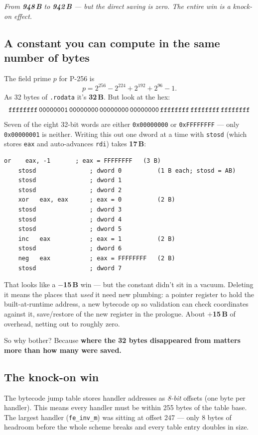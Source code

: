 \documentclass[11pt,a4paper]{article}
\newcommand{\bytes}[1]{\textcolor{blue!60!black}{\textbf{#1\,B}}}
\newcommand{\saved}[1]{\textcolor{green!50!black}{\textbf{$-$#1\,B}}}
\newcommand{\spent}[1]{\textcolor{red!70!black}{\textbf{$+$#1\,B}}}
\begin{document}
\noindent\emph{From \bytes{948} to \bytes{942} --- but the direct
saving is zero. The entire win is a knock-on effect.}

\subsection{A constant you can compute in the same number of bytes}

The field prime $p$ for P-256 is
\[
  p = 2^{256} - 2^{224} + 2^{192} + 2^{96} - 1.
\]
As 32 bytes of \texttt{.rodata} it's \bytes{32}. But look at the hex:
\[
\texttt{ffffffff\,00000001\,00000000\,00000000\,00000000\,ffffffff\,ffffffff\,ffffffff}
\]
Seven of the eight 32-bit words are either \texttt{0x00000000} or
\texttt{0xFFFFFFFF} --- only \texttt{0x00000001} is neither. Writing
this out one dword at a time with \texttt{stosd} (which stores
\texttt{eax} and auto-advances \texttt{rdi}) takes \bytes{17}:
\begin{lstlisting}[language={[x86masm]Assembler}]
    or    eax, -1       ; eax = FFFFFFFF   (3 B)
    stosd               ; dword 0          (1 B each; stosd = AB)
    stosd               ; dword 1
    stosd               ; dword 2
    xor   eax, eax      ; eax = 0          (2 B)
    stosd               ; dword 3
    stosd               ; dword 4
    stosd               ; dword 5
    inc   eax           ; eax = 1          (2 B)
    stosd               ; dword 6
    neg   eax           ; eax = FFFFFFFF   (2 B)
    stosd               ; dword 7
\end{lstlisting}
That looks like a \saved{15} win --- but the constant didn't sit in a
vacuum. Deleting it means the places that \emph{used} it need new
plumbing: a pointer register to hold the built-at-runtime address, a
new bytecode op so validation can check coordinates against it,
save/restore of the new register in the prologue. About \spent{15} of
overhead, netting out to roughly zero.

So why bother? Because \textbf{where the 32 bytes disappeared from
matters more than how many were saved.}

\subsection{The knock-on win}

The bytecode jump table stores handler addresses as \emph{8-bit}
offsets (one byte per handler). This means every handler must be
within 255 bytes of the table base. The largest handler
(\texttt{fe\_inv\_m}) was sitting at offset 247 --- only 8 bytes of
headroom before the whole scheme breaks and every table entry doubles
in size.
\end{document}
